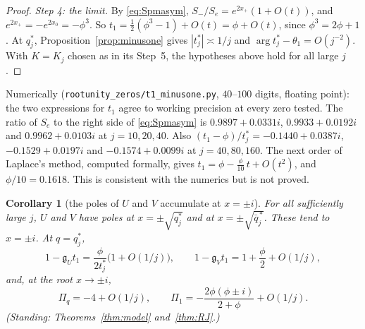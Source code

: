 \documentclass[11pt]{article}
\theoremstyle{plain}
\newtheorem{corollary}[theorem]{Corollary}
\theoremstyle{definition}
\theoremstyle{remark}
\theoremstyle{plain}\newtheorem*{maintheorem}{Main Theorem}
\begin{document}
\begin{proof}
\emph{Step 4: the limit.} By \eqref{eq:Spmasym}, $S_-/S_e=e^{2x_+}(1+O(t))$, and
$e^{2x_+}=-e^{2x_0}=-\phi^3$. So $t_1=\frac12(\phi^3-1)+O(t)=\phi+O(t)$, since
$\phi^3=2\phi+1$. At $q^\ast_j$, Proposition~\ref{prop:minusone} gives $|t^\ast_j|\asymp1/j$ and
$\arg t^\ast_j-\theta_1=O(j^{-2})$. With $K=K_j$ chosen as in its Step~5, the hypotheses above hold
for all large $j$.
\end{proof}

\noindent Numerically (\texttt{rootunity\_zeros/t1\_minusone.py}, $40$--$100$ digits, floating
point): the two expressions for $t_1$ agree to working precision at every zero tested. The ratio of
$S_e$ to the right side of \eqref{eq:Spmasym} is $0.9897+0.0331i$, $0.9933+0.0192i$ and
$0.9962+0.0103i$ at $j=10,20,40$. Also $(t_1-\phi)/t^\ast_j=-0.1440+0.0387i$, $-0.1529+0.0197i$ and
$-0.1574+0.0099i$ at $j=40,80,160$. The next order of Laplace's method, computed formally, gives
$t_1=\phi-\tfrac{\phi}{10}\,t+O(t^2)$, and $\phi/10=0.1618$. This is consistent with the numerics
but is not proved.

\begin{corollary}[the poles of $U$ and $V$ accumulate at $x=\pm i$]\label{cor:Uminusone}
For all sufficiently large $j$, $U$ and $V$ have poles at $x=\pm\sqrt{q^\ast_j}$ and at
$x=\pm\sqrt{\bar q^{\,\ast}_j}$. These tend to $x=\pm i$. At $q=q^\ast_j$,
\[
   1-\mathfrak g_Ut_1=\frac{\phi}{2t^\ast_j}\bigl(1+O(1/j)\bigr),\qquad
   1-\mathfrak g_Vt_1=1+\frac\phi2+O(1/j),
\]
and, at the root $x\to\pm i$,
\[
   \Pi_q=-4+O(1/j),\qquad \Pi_1=-\frac{2\phi(\phi\pm i)}{2+\phi}+O(1/j).
\]
\textup{(}Standing: Theorems~\ref{thm:model} and~\ref{thm:RJ}.\textup{)}
\end{corollary}
\end{document}
